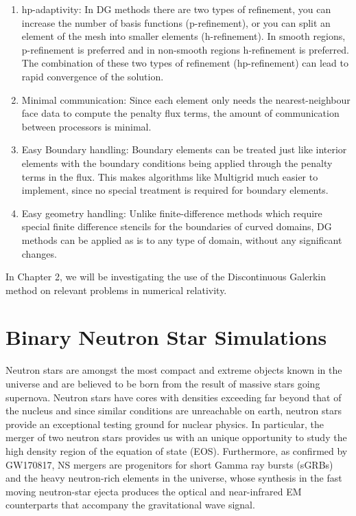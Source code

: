 \begin{enumerate}
\item hp-adaptivity: In DG methods there are two types of refinement, you can increase the number of basis functions (p-refinement), or you can split an element of the mesh into smaller elements (h-refinement). In smooth regions, p-refinement is preferred and in non-smooth regions h-refinement is preferred. The combination of these two types of refinement (hp-refinement) can lead to rapid convergence of the solution.
\item Minimal communication: Since each element only needs the nearest-neighbour face data to compute the penalty flux terms, the amount of communication between processors is minimal.
\item Easy Boundary handling: Boundary elements can be treated just like interior elements with the boundary conditions being applied through the penalty terms in the flux. This makes algorithms like Multigrid much easier to implement, since no special treatment is required for boundary elements.
\item Easy geometry handling: Unlike finite-difference methods which require special finite difference stencils for the boundaries of curved domains, DG methods can be applied as is to any type of domain, without any significant changes.
\end{enumerate}

In Chapter 2, we will be investigating the use of the Discontinuous Galerkin method on relevant problems in numerical relativity.

\section{Binary Neutron Star Simulations}

Neutron stars are amongst the most compact and extreme objects known in
the universe and are believed to be born from the result of
massive stars going supernova. Neutron stars have cores with densities exceeding far beyond that
of the nucleus and since similar conditions are unreachable on earth, neutron stars provide an exceptional testing ground for nuclear physics. In particular, the merger of two neutron stars provides us with an unique opportunity to study the high density region of the equation of state (EOS). Furthermore, as confirmed by GW170817, NS mergers are progenitors for short Gamma ray bursts (sGRBs) and the
heavy neutron-rich elements in the universe, whose synthesis in the fast moving neutron-star ejecta produces the optical and near-infrared EM counterparts that accompany the gravitational wave signal.


